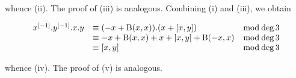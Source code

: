whence (ii). The proof of (iii) is analogous. Combining (i) and (iii), we obtain

\[
\begin{array}{r l r} x ^ {[ - 1 ]}. y ^ {[ - 1 ]}. x. y & \equiv (- x + \mathrm{B} (x, x)). (x + [ x, y ]) & \bmod \deg 3 \\ & \equiv - x + \mathrm{B} (x, x) + x + [ x, y ] + \mathrm{B} (- x, x) & \bmod \deg 3 \\ & \equiv [ x, y ] & \bmod \deg 3 \end{array}
\]

whence (iv). The proof of (v) is analogous.

